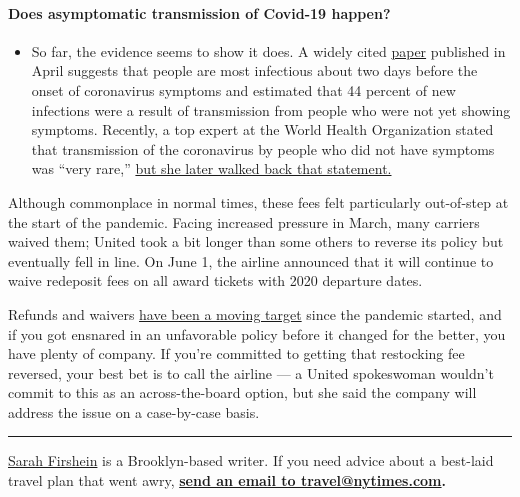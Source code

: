 \begin{itemize}
{  \paragraph{Does asymptomatic transmission of Covid-19
  happen?}\label{does-asymptomatic-transmission-of-covid-19-happen}}

  \begin{itemize}
  \tightlist
  \item
    So far, the evidence seems to show it does. A widely cited
    \href{https://www.nature.com/articles/s41591-020-0869-5}{paper}
    published in April suggests that people are most infectious about
    two days before the onset of coronavirus symptoms and estimated that
    44 percent of new infections were a result of transmission from
    people who were not yet showing symptoms. Recently, a top expert at
    the World Health Organization stated that transmission of the
    coronavirus by people who did not have symptoms was ``very rare,''
    \href{https://www.nytimes.com/2020/06/09/world/coronavirus-updates.html?action=click\&pgtype=Article\&state=default\&region=MAIN_CONTENT_3\&context=storylines_faq\#link-1f302e21}{but
    she later walked back that statement.}
  \end{itemize}
\end{itemize}

Although commonplace in normal times, these fees felt particularly
out-of-step at the start of the pandemic. Facing increased pressure in
March, many carriers waived them; United took a bit longer than some
others to reverse its policy but eventually fell in line. On June 1, the
airline announced that it will continue to waive redeposit fees on all
award tickets with 2020 departure dates.

Refunds and waivers
\href{https://www.nytimes.com/2020/04/11/travel/coronavirus-travel-trip-refunds.html}{have
been a moving target} since the pandemic started, and if you got
ensnared in an unfavorable policy before it changed for the better, you
have plenty of company. If you're committed to getting that restocking
fee reversed, your best bet is to call the airline --- a United
spokeswoman wouldn't commit to this as an across-the-board option, but
she said the company will address the issue on a case-by-case basis.

\begin{center}\rule{0.5\linewidth}{\linethickness}\end{center}

\href{https://twitter.com/sfirshein?lang=en}{Sarah Firshein} is a
Brooklyn-based writer. If you need advice about a best-laid travel plan
that went awry, \textbf{\href{mailto:travel@nytimes.com}{send an email
to travel@nytimes.com}.}

